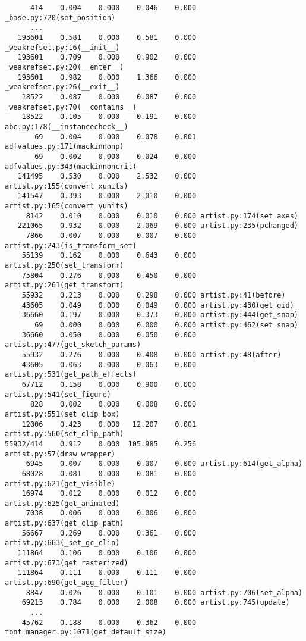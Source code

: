 \documentclass{article}
\begin{document}
\begin{verbatim}
      414    0.004    0.000    0.046    0.000 _base.py:720(set_position)
      ...
   193601    0.581    0.000    0.581    0.000 _weakrefset.py:16(__init__)
   193601    0.709    0.000    0.902    0.000 _weakrefset.py:20(__enter__)
   193601    0.982    0.000    1.366    0.000 _weakrefset.py:26(__exit__)
    18522    0.087    0.000    0.087    0.000 _weakrefset.py:70(__contains__)
    18522    0.105    0.000    0.191    0.000 abc.py:178(__instancecheck__)
       69    0.004    0.000    0.078    0.001 adfvalues.py:171(mackinnonp)
       69    0.002    0.000    0.024    0.000 adfvalues.py:343(mackinnoncrit)
   141495    0.530    0.000    2.532    0.000 artist.py:155(convert_xunits)
   141547    0.393    0.000    2.010    0.000 artist.py:165(convert_yunits)
     8142    0.010    0.000    0.010    0.000 artist.py:174(set_axes)
   221065    0.932    0.000    2.069    0.000 artist.py:235(pchanged)
     7866    0.007    0.000    0.007    0.000 artist.py:243(is_transform_set)
    55139    0.162    0.000    0.643    0.000 artist.py:250(set_transform)
    75804    0.276    0.000    0.450    0.000 artist.py:261(get_transform)
    55932    0.213    0.000    0.298    0.000 artist.py:41(before)
    43605    0.049    0.000    0.049    0.000 artist.py:430(get_gid)
    36660    0.197    0.000    0.373    0.000 artist.py:444(get_snap)
       69    0.000    0.000    0.000    0.000 artist.py:462(set_snap)
    36660    0.050    0.000    0.050    0.000 artist.py:477(get_sketch_params)
    55932    0.276    0.000    0.408    0.000 artist.py:48(after)
    43605    0.063    0.000    0.063    0.000 artist.py:531(get_path_effects)
    67712    0.158    0.000    0.900    0.000 artist.py:541(set_figure)
      828    0.002    0.000    0.008    0.000 artist.py:551(set_clip_box)
    12006    0.423    0.000   12.207    0.001 artist.py:560(set_clip_path)
55932/414    0.912    0.000  105.985    0.256 artist.py:57(draw_wrapper)
     6945    0.007    0.000    0.007    0.000 artist.py:614(get_alpha)
    68028    0.081    0.000    0.081    0.000 artist.py:621(get_visible)
    16974    0.012    0.000    0.012    0.000 artist.py:625(get_animated)
     7038    0.006    0.000    0.006    0.000 artist.py:637(get_clip_path)
    56667    0.269    0.000    0.361    0.000 artist.py:663(_set_gc_clip)
   111864    0.106    0.000    0.106    0.000 artist.py:673(get_rasterized)
   111864    0.111    0.000    0.111    0.000 artist.py:690(get_agg_filter)
     8847    0.026    0.000    0.101    0.000 artist.py:706(set_alpha)
    69213    0.784    0.000    2.008    0.000 artist.py:745(update)
      ...
    45762    0.188    0.000    0.362    0.000 font_manager.py:1071(get_default_size)

\end{verbatim}
\end{document}
